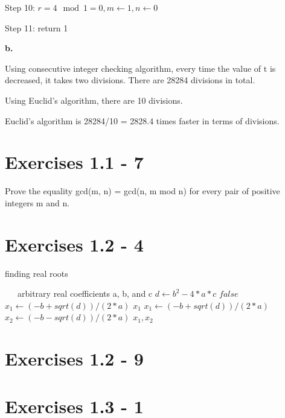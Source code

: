 \documentclass{article}
\begin{document}
Step 10: $r = 4 \mod 1 = 0, m \leftarrow 1, n \leftarrow 0 $

Step 11: return 1

\textbf{b.}

Using consecutive integer checking algorithm, every time the value of t is decreased, it takes two divisions. There are 28284 divisions in total.

Using Euclid's algorithm, there are 10 divisions.

Euclid's algorithm is 28284/10 = 2828.4 times faster in terms of divisions.

\section{Exercises 1.1 - 7}

Prove the equality gcd(m, n) = gcd(n, m mod n) for every pair of positive integers m and n.

\section{Exercises 1.2 - 4}

\begin{algorithm}
\caption{finding real roots}
\begin{algorithmic}[1]
\REQUIRE ~~\
arbitrary real coefficients a, b, and c
\STATE $ d \leftarrow b^2-4*a*c  $
\RETURN $false$
\STATE $ x_1 \leftarrow (-b + sqrt(d))/(2*a)$
\RETURN $x_1$
\STATE $x_1 \leftarrow (-b + sqrt(d))/(2*a)$
\STATE $x_2 \leftarrow (-b - sqrt(d))/(2*a)$
\RETURN $ x_1, x_2$
\ENDIF
\end{algorithmic}
\end{algorithm}

\section{Exercises 1.2 - 9}


\section{Exercises 1.3 - 1}
\end{document}
